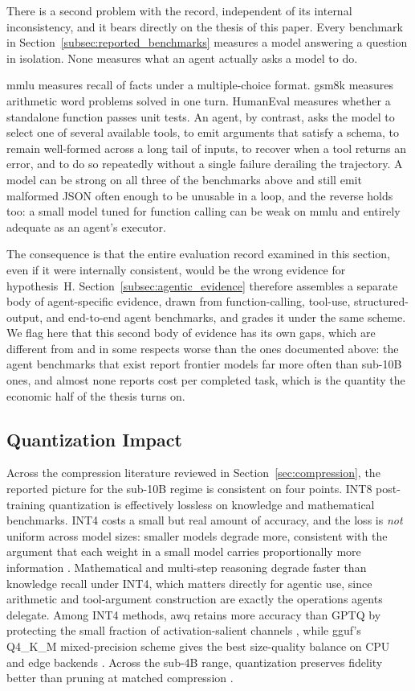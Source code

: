 There is a second problem with the record, independent of its internal
inconsistency, and it bears directly on the thesis of this paper. Every benchmark
in Section~\ref{subsec:reported_benchmarks} measures a model answering a question
in isolation. None measures what an agent actually asks a model to do.

\gls{mmlu} measures recall of facts under a multiple-choice format. \gls{gsm8k}
measures arithmetic word problems solved in one turn. HumanEval measures whether
a standalone function passes unit tests. An agent, by contrast, asks the model to
select one of several available tools, to emit arguments that satisfy a schema,
to remain well-formed across a long tail of inputs, to recover when a tool
returns an error, and to do so repeatedly without a single failure derailing the
trajectory. A model can be strong on all three of the benchmarks above and still
emit malformed JSON often enough to be unusable in a loop, and the reverse holds
too: a small model tuned for function calling can be weak on \gls{mmlu} and
entirely adequate as an agent's executor.

The consequence is that the entire evaluation record examined in this section,
even if it were internally consistent, would be the wrong evidence for
hypothesis~H. Section~\ref{subsec:agentic_evidence} therefore assembles a
separate body of agent-specific evidence, drawn from function-calling, tool-use,
structured-output, and end-to-end agent benchmarks, and grades it under the same
scheme. We flag here that this second body of evidence has its own gaps, which
are different from and in some respects worse than the ones documented above:
the agent benchmarks that exist report frontier models far more often than
sub-10B ones, and almost none reports cost per completed task, which is the
quantity the economic half of the thesis turns on.

\subsection{Quantization Impact}
\label{subsec:reported_quantization}

Across the compression literature reviewed in Section~\ref{sec:compression}, the
reported picture for the sub-10B regime is consistent on four points. INT8
post-training quantization is effectively lossless on knowledge and mathematical
benchmarks. INT4 costs a small but real amount of accuracy, and the loss is
\emph{not} uniform across model sizes: smaller models degrade more, consistent
with the argument that each weight in a small model carries proportionally more
information \citep{slmquant2025}. Mathematical and multi-step reasoning degrade
faster than knowledge recall under INT4, which matters directly for agentic use,
since arithmetic and tool-argument construction are exactly the operations agents
delegate. Among INT4 methods, \gls{awq} retains more accuracy than GPTQ by
protecting the small fraction of activation-salient channels
\citep{lin2024awq}, while \gls{gguf}'s Q4\_K\_M mixed-precision scheme gives the
best size-quality balance on CPU and edge backends
\citep{gerganov2023llamacpp}. Across the sub-4B range, quantization preserves
fidelity better than pruning at matched compression
\citep{kurz2025pruning_vs_quant}.

